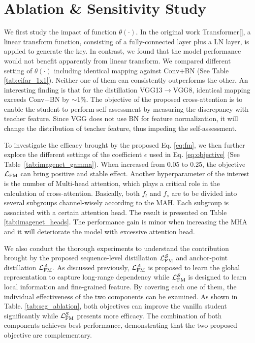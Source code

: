 \documentclass[10pt,twocolumn,letterpaper]{article}
\begin{document}
\section{Ablation \& Sensitivity Study}
\label{sec:ablation}
We first study the impact of function $\theta(\cdot)$. In the original work Transformer[], a linear transform function, consisting of a fully-connected layer plus a LN layer, is applied to generate the key. In contrast, we found that the model performance would not benefit apparently from linear transform. We compared different setting of $\theta(\cdot)$ including identical mapping against Conv$+$BN (See Table \ref{tab:cifar_1x1}). Neither one of them can consistently outperforms the other. An interesting finding is that for the distillation VGG13$\rightarrow$VGG8, identical mapping exceeds Conv$+$BN by $\sim$1\%. The objective of the proposed cross-attention is to enable the student to perform self-assessment by measuring the discrepancy with teacher feature. Since VGG does not use BN for feature normalization, it will change the distribution of teacher feature, thus impeding the self-assessment. 

To investigate the efficacy brought by the proposed Eq. \ref{eq:fm}, we then further explore the different settings of the coefficient $\epsilon$ used in Eq. \ref{eq:objective} (See Table~\ref{tab:imagenet_gamma}). When increased from 0.05 to 0.25, the objective $\mathcal{L}_{\rm{FM}}$ can bring positive and stable effect. Another hyperparameter of the interest is the number of Multi-head attention, which plays a critical role in the calculation of cross-attention. Basically, both $f_t$ and $f_s$ are to be divided into several subgroups channel-wisely according to the MAH. Each subgroup is associated with a certain attention head. The result is presented on Table \ref{tab:imagenet_heads}. The performance gain is minor when increasing the MHA and it will deteriorate the model with excessive attention head. 

We also conduct the thorough experiments to understand the contribution brought by the proposed sequence-level distillation $\mathcal{L}_{\rm{FM}}^{\mathcal{S}}$ and anchor-point distillation $\mathcal{L}_{\rm{FM}}^{\mathcal{A}}$. As discussed previously, $\mathcal{L}_{\rm{FM}}^{\mathcal{A}}$ is proposed to learn the global representation to capture long-range dependency while $\mathcal{L}_{\rm{FM}}^{\mathcal{S}}$ is designed to learn local information and fine-grained feature. 
By covering each one of them, the individual effectiveness of the two components can be examined.  
As shown in Table. \ref{tab:seg_ablation}, both objectives can improve the vanilla student significantly while $\mathcal{L}_{\rm{FM}}^{\mathcal{S}}$ presents more efficacy. 
The combination of both components achieves best performance, demonstrating that the two proposed objective are complementary.  
\end{document}
